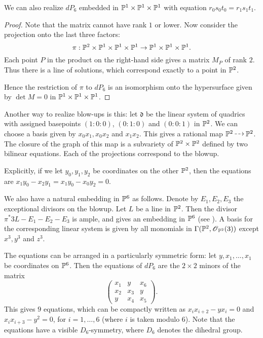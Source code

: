 \begin{lemma}
We can also realize $dP_6$ embedded in $\mathbb{P}^1 \times \mathbb{P}^1 \times \mathbb{P}^1$ with equation $r_0s_0t_0=r_1s_1t_1$.
\end{lemma}
\begin{proof}
Note that the matrix cannot have rank $1$ or lower. Now consider the projection onto the last three factors:
$$
\pi:\mathbb{P}^2 \times \mathbb{P}^1 \times \mathbb{P}^1 \times \mathbb{P}^1 \to \mathbb{P}^1 \times \mathbb{P}^1 \times \mathbb{P}^1.
$$
Each point $P$ in the product on the right-hand side gives a matrix $M_P$ of rank $2$. Thus there is a line of solutions, which correspond exactly to a point in $\mathbb{P}^2$.

Hence the restriction of $\pi$ to $dP_6$ is an isomorphism onto the hypersurface given by $\det M=0$ in $\mathbb{P}^1 \times \mathbb{P}^1 \times \mathbb{P}^1$. 
\end{proof}

Another way to realize blow-ups is this: let $\mathfrak d$ be the linear system of quadrics with assigned basepoints $(1:0:0)$, $(0:1:0)$ and $(0:0:1)$ in $\mathbb{P}^2$. We can choose a basis given by $x_0x_1,x_0x_2$ and $x_1x_2$. This gives a rational map $\PP^2 \rmap \PP^2$. The closure of the graph of this map is a subvariety of $\mathbb{P}^2 \times \mathbb{P}^2$ defined by two bilinear equations. Each of the projections correspond to the blowup.

Explicitly, if we let $y_0,y_1,y_2$ be coordinates on the other $\mathbb{P}^2$, then the equations are $x_1y_0-x_2y_1=x_1y_0-x_0y_2=0$.

We also have a natural embedding in $\mathbb{P}^6$ as follows. Denote by $E_1, E_2, E_3$ the exceptional divisors on the blowup. Let $L$ be a line in $\mathbb{P}^2$. Then the divisor $\pi^\ast 3L - E_1-E_2-E_3$ is ample, and gives an embedding in $\mathbb{P}^6$ (see \cite[Chapter V, Theorem 4.6]{hartshorne}). A basis for the corresponding linear system is given by all monomials in $\Gamma(\mathbb{P}^2,\operatorname{\mathscr{O}}_{\mathbb{P}^2}(3))$ except $x^3,y^3$ and $z^3$. 

The equations can be arranged in a particularly symmetric form: let $y,x_1,\ldots,x_1$ be coordinates on $\mathbb{P}^6$. Then the equations of $dP_6$ are the $2 \times 2$ minors of the matrix
$$
\begin{pmatrix}
x_1 & y & x_6 \\
x_2 & x_3 & y \\
y & x_4 & x_5
\end{pmatrix}.
$$
This gives $9$ equations, which can be compactly written as $x_ix_{i+2}-yx_i=0$ and $x_ix_{i+3}-y^2=0$, for $i=1,\ldots,6$ (where $i$ is taken modulo $6$). Note that the equations have a visible $D_6$-symmetry, where $D_6$ denotes the dihedral group.

